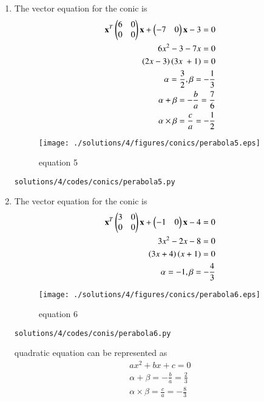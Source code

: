 \begin{enumerate}[label=\arabic*.,ref=\thesubsection.\theenumi]
\item The vector equation for the conic is
\begin{align}
\mathbf{x}^T\begin{pmatrix}6 & 0\\0 & 0\end{pmatrix}\mathbf{x} + \begin{pmatrix}-7 & 0\end{pmatrix}\mathbf{x} -3= 0
\\
6x^2-3-7x = 0
\\
\left(2x - 3\right)\left(3x\ + 1\right) = 0
\\
\alpha = \frac{3}{2},\beta =-\frac{1}{3}
\\
\alpha +\beta = -\frac{b}{a} = \frac{7}{6}
\\
\alpha \times \beta = \frac{c}{a} = -\frac{1}{2}
\end{align}
	\begin{figure}[!ht]
	\centering
	\texttt{[image: ./solutions/4/figures/conics/perabola5.eps]}
	\caption{equation 5 }
	\label{fig:5.2.3_perabola5}
\end{figure}
\begin{lstlisting}
solutions/4/codes/conics/perabola5.py
\end{lstlisting}

\item The vector equation for the conic is
\begin{align}
\mathbf{x}^T\begin{pmatrix}3 & 0\\0 & 0\end{pmatrix}\mathbf{x} + \begin{pmatrix}-1 & 0\end{pmatrix}\mathbf{x} -4= 0
\\
3x^2-2x-8 = 0
\\
\left(3x + 4\right)\left(x + 1\right) = 0
\\
\alpha = -1,\beta =-\frac{4}{3}
\end{align}

\begin{figure}[!ht]
	\centering
	\texttt{[image: ./solutions/4/figures/conics/perabola6.eps]}
	\caption{equation 6 }
	\label{fig:5.2.3_perabola6}
\end{figure}
\begin{lstlisting}
solutions/4/codes/conis/perabola6.py
\end{lstlisting}
quadratic equation can be represented as 
\begin{align}
ax^2+bx +c = 0
\\
\alpha +\beta = -\frac{b}{a} = \frac{2}{3}
\\
\alpha \times \beta = \frac{c}{a} = -\frac{8}{3}
\end{align}

\end{enumerate}
